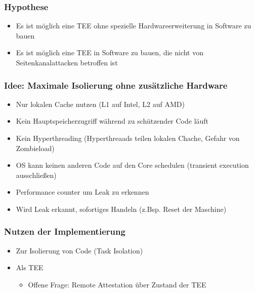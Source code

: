 \documentclass{beamer}
\begin{document}
\begin{frame}
    \frametitle{Hypothese}
    \begin{itemize}
        \item Es ist möglich eine TEE ohne spezielle Hardwareerweiterung in Software zu bauen
              \bigskip
        \item Es ist möglich eine TEE in Software zu bauen, die nicht von Seitenkanalattacken betroffen ist
    \end{itemize}
\end{frame}

\begin{frame}
    \frametitle{Idee: Maximale Isolierung ohne zusätzliche Hardware}
    \begin{itemize}
        \item Nur lokalen Cache nutzen (L1 auf Intel, L2 auf AMD)
        \item Kein Hauptspeicherzugriff während zu schützender Code läuft
        \item Kein Hyperthreading (Hyperthreaads teilen lokalen Chache, Gefahr von Zombieload)
        \item OS kann keinen anderen Code auf den Core schedulen (transient execution ausschließen)
        \item Performance counter um Leak zu erkennen
        \item Wird Leak erkannt, sofortiges Handeln (z.Bsp. Reset der Maschine)
    \end{itemize}
\end{frame}

\begin{frame}
    \frametitle{Nutzen der Implementierung}
    \begin{itemize}
        \item Zur Isolierung von Code (Task Isolation)
              \bigskip
        \item Als TEE
              \begin{itemize}
                  \item Offene Frage: Remote Attestation über Zustand der TEE
              \end{itemize}
    \end{itemize}
\end{frame}
\end{document}
